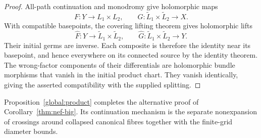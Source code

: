 \begin{proof}
All-path continuation and monodromy give holomorphic maps
\[
 F:Y\longrightarrow L_1\times L_2,
 \qquad G:\widetilde L_1\times\widetilde L_2\longrightarrow X.
\]
With compatible basepoints, the covering lifting theorem gives
holomorphic lifts
\[
 \widehat F:Y\longrightarrow\widetilde L_1\times\widetilde L_2,
 \qquad \widehat G:\widetilde L_1\times\widetilde L_2\longrightarrow Y.
\]
Their initial germs are inverse. Each composite is therefore the
identity near its basepoint, and hence everywhere on its connected
source by the identity theorem. The wrong-factor components of their
differentials are holomorphic bundle morphisms that vanish in the
initial product chart. They vanish identically, giving the asserted
compatibility with the supplied splitting.
\end{proof}

Proposition~\ref{global:product} completes the alternative proof of
Corollary~\ref{thm:nef-big}. Its continuation mechanism is the separate
nonexpansion of crossings around collapsed canonical fibres together
with the finite-grid diameter bounds.
